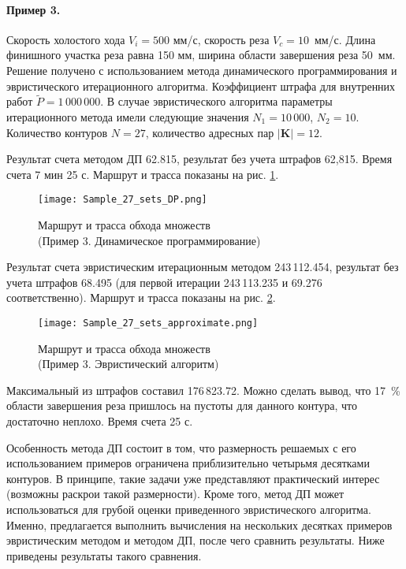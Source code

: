 \paragraph*{Пример 3.}

Скорость холостого хода $V_i=500$ мм/с,
скорость реза $V_c=10$~мм/с.
Длина финишного участка реза равна 150 мм,
ширина области завершения реза 50~мм.
Решение получено с использованием метода динамического программирования
и эвристического итерационного алгоритма.
Коэффициент штрафа для внутренних работ
$\tilde{P}=1\,000\,000$.
В случае эвристического алгоритма параметры итерационного
метода имели следующие значения
$N_1=10\,000$,
$N_2=10$.
Количество контуров $N=27$,
количество адресных пар $|\mathbf{K}|=12$.

Результат счета методом ДП 62.815,
результат без учета штрафов 62,815.
Время счета 7 мин 25 с.
Маршрут и трасса показаны на рис. \ref{Sample3DP}.

\begin{figure}[h]
  \begin{center}
  \texttt{[image: Sample\_27\_sets\_DP.png]}
  \caption{
    Маршрут и трасса обхода множеств\\
    (Пример 3. Динамическое программирование)
    }
  \label{Sample3DP}
  \end{center}
\end{figure}

Результат счета эвристическим итерационным методом 243\,112.454,
результат без учета штрафов 68.495
(для первой итерации 243\,113.235 и 69.276
соответственно).
Маршрут и трасса показаны на рис. \ref{Sample3Heuristic}.

\begin{figure}[h]
  \begin{center}
  \texttt{[image: Sample\_27\_sets\_approximate.png]}
  \caption{
    Маршрут и трасса обхода множеств\\
    (Пример 3. Эвристический алгоритм)
    }
  \label{Sample3Heuristic}
  \end{center}
\end{figure}

Максимальный из штрафов составил 176\,823.72.
Можно сделать вывод, что 17~\% области завершения реза пришлось на пустоты для
данного контура, что достаточно неплохо.
Время счета 25 с.

Особенность метода ДП состоит в том,
что размерность решаемых с его использованием примеров
ограничена приблизительно четырьмя десятками контуров.
В принципе, такие задачи уже представляют практический интерес
(возможны раскрои такой размерности).
Кроме того, метод ДП может использоваться для грубой оценки
приведенного эвристического алгоритма.
Именно, предлагается выполнить вычисления на нескольких десятках
примеров эвристическим методом и методом ДП,
после чего сравнить результаты.
Ниже приведены результаты такого сравнения.


